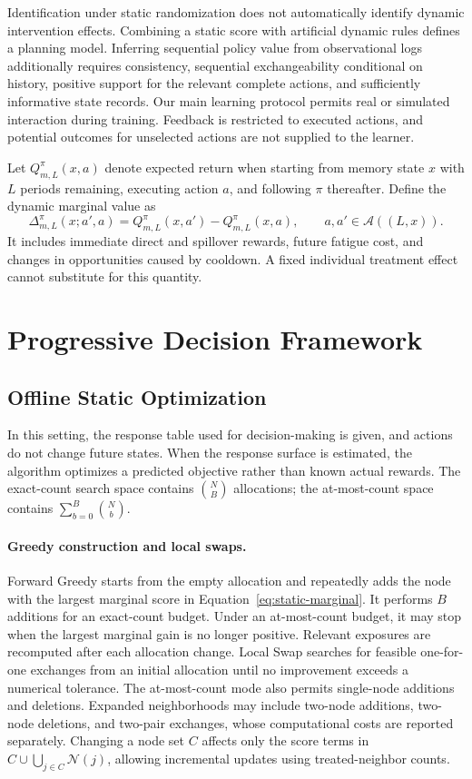 \documentclass[a4paper,11pt]{article}
\numberwithin{equation}{section}
\begin{document}
Identification under static randomization does not automatically identify dynamic intervention effects. Combining a static score with artificial dynamic rules defines a planning model. Inferring sequential policy value from observational logs additionally requires consistency, sequential exchangeability conditional on history, positive support for the relevant complete actions, and sufficiently informative state records. Our main learning protocol permits real or simulated interaction during training. Feedback is restricted to executed actions, and potential outcomes for unselected actions are not supplied to the learner.

Let $Q_{m,L}^\pi(x,a)$ denote expected return when starting from memory state $x$ with $L$ periods remaining, executing action $a$, and following $\pi$ thereafter. Define the dynamic marginal value as
\begin{equation}
\Delta_{m,L}^\pi(x;a',a)=Q_{m,L}^\pi(x,a')-Q_{m,L}^\pi(x,a),\qquad
a,a'\in\mathcal A((L,x)).
\label{eq:dynamic-marginal}
\end{equation}
It includes immediate direct and spillover rewards, future fatigue cost, and changes in opportunities caused by cooldown. A fixed individual treatment effect cannot substitute for this quantity.

\section{Progressive Decision Framework}
\subsection{Offline Static Optimization}
\label{sec:offline}
In this setting, the response table used for decision-making is given, and actions do not change future states. When the response surface is estimated, the algorithm optimizes a predicted objective rather than known actual rewards. The exact-count search space contains $\binom NB$ allocations; the at-most-count space contains $\sum_{b=0}^B\binom Nb$.

\paragraph{Greedy construction and local swaps.}
Forward Greedy starts from the empty allocation and repeatedly adds the node with the largest marginal score in Equation~\eqref{eq:static-marginal}. It performs $B$ additions for an exact-count budget. Under an at-most-count budget, it may stop when the largest marginal gain is no longer positive. Relevant exposures are recomputed after each allocation change. Local Swap searches for feasible one-for-one exchanges from an initial allocation until no improvement exceeds a numerical tolerance. The at-most-count mode also permits single-node additions and deletions. Expanded neighborhoods may include two-node additions, two-node deletions, and two-pair exchanges, whose computational costs are reported separately. Changing a node set $C$ affects only the score terms in $C\cup\bigcup_{j\in C}\mathcal N(j)$, allowing incremental updates using treated-neighbor counts.
\end{document}
